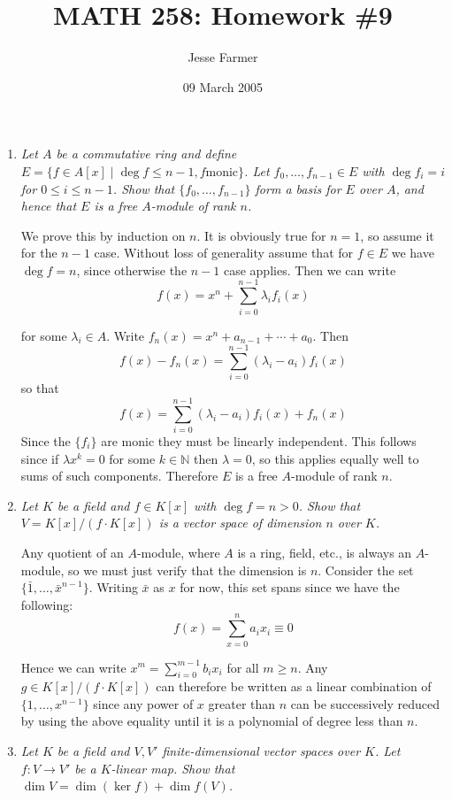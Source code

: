 \documentclass[10pt]{article}
\title{MATH 258: Homework \#9}
\author{Jesse Farmer}
\date{09 March 2005}
\newcommand{\N}{\mathbb{N}}
\begin{document}
\maketitle
\begin{enumerate}

\item \emph{Let $A$ be a commutative ring and define $E = \{ f \in A[x] \mid \deg f \leq n-1, f \text{monic}\}$.  Let $f_0, \ldots, f_{n-1} \in E$ with $\deg f_i = i$ for $0 \leq i \leq n-1$.  Show that $\{f_0, \ldots, f_{n-1}\}$ form a basis for $E$ over $A$, and hence that $E$ is a free $A$-module of rank $n$.}

We prove this by induction on $n$.  It is obviously true for $n=1$, so assume it for the $n-1$ case.  Without loss of generality assume that for $f \in E$ we have $\deg f = n$, since otherwise the $n-1$ case applies.  Then we can write
\[
f(x) = x^n + \sum_{i=0}^{n-1} \lambda_i f_i(x)
\]

for some $\lambda_i \in A$.  Write $f_n(x) = x^n + a_{n-1} + \cdots + a_0$.  Then $$f(x) - f_n(x) = \sum_{i=0}^{n-1} (\lambda_i - a_i)f_i(x)$$ so that $$f(x) = \sum_{i=0}^{n-1} (\lambda_i - a_i)f_i(x) + f_n(x)$$  Since the $\{f_i\}$ are monic they must be linearly independent.  This follows since if $\lambda x^k = 0$ for some $k \in \N$ then $\lambda = 0$, so this applies equally well to sums of such components.  Therefore $E$ is a free $A$-module of rank $n$.

\item \emph{Let $K$ be a field and $f \in K[x]$ with $\deg f = n > 0$.  Show that $V = K[x]/(f \cdot K[x])$ is a vector space of dimension $n$ over $K$.}

Any quotient of an $A$-module, where $A$ is a ring, field, etc., is always an $A$-module, so we must just verify that the dimension is $n$.  Consider the set $\{\bar{1}, \ldots, \bar{x}^{n-1}\}$.  Writing $\bar{x}$ as $x$ for now, this set spans since we have the following:
\[
f(x) = \sum_{x=0}^n a_i x_i \equiv 0
\]

Hence we can write $x^m = \sum_{i=0}^{m-1} b_i x_i$ for all $m \geq n$.  Any $g \in K[x] / (f \cdot K[x])$ can therefore be written as a linear combination of $\{1, \ldots, x^{n-1}\}$ since any power of $x$ greater than $n$ can be successively reduced by using the above equality until it is a polynomial of degree less than $n$.

\item \emph{Let $K$ be a field and $V, V'$ finite-dimensional vector spaces over $K$.  Let $f: V \rightarrow V'$ be a $K$-linear map.  Show that $\dim V = \dim(\ker f) + \dim f(V)$.}


\end{enumerate}
\end{document}

